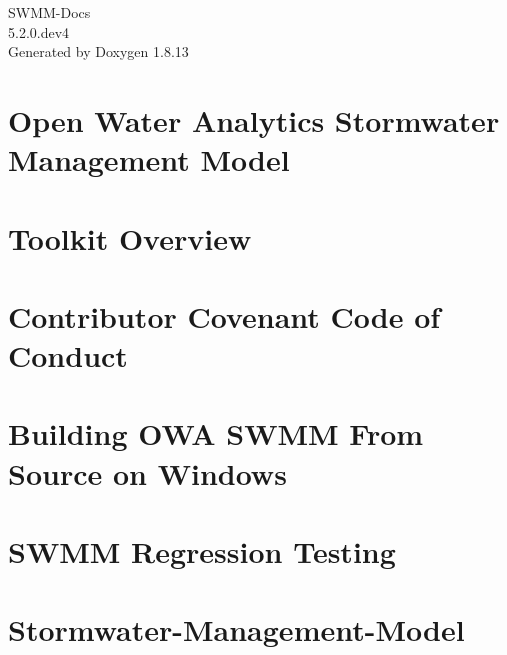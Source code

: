 \documentclass[twoside]{book}
\newcommand{\+}{\discretionary{\mbox{\scriptsize$\hookleftarrow$}}{}{}}
\newcommand{\clearemptydoublepage}{%
  \newpage{\pagestyle{empty}\cleardoublepage}%
}
\begin{document}
\hypersetup{pageanchor=false,
             bookmarksnumbered=true,
             pdfencoding=unicode
            }
\begin{titlepage}
\vspace*{7cm}
\begin{center}%
{\Large S\+W\+M\+M-\/\+Docs \\[1ex]\large 5.\+2.\+0.\+dev4 }\\
\vspace*{1cm}
{\large Generated by Doxygen 1.8.13}\\
\end{center}
\end{titlepage}
\clearemptydoublepage
{}
\tableofcontents
\clearemptydoublepage
{}
\hypersetup{pageanchor=true}

\chapter{Open Water Analytics Stormwater Management Model}
\label{index}\hypertarget{index}{}
\chapter{Toolkit Overview}
\label{toolkit-overview}

\chapter{Contributor Covenant Code of Conduct}
\label{md__8github__c_o_d_e__o_f__c_o_n_d_u_c_t}

\chapter{Building O\+WA S\+W\+MM From Source on Windows}
\label{md__8github__c_o_n_t_r_i_b_u_t_i_n_g}

\chapter{S\+W\+MM Regression Testing}
\label{md__8github__r_e_g_r_e_s_s_i_o_n__t_e_s_t_i_n_g}

\chapter{Stormwater-\/\+Management-\/\+Model}
\label{md__r_e_a_d_m_e}

\end{document}
